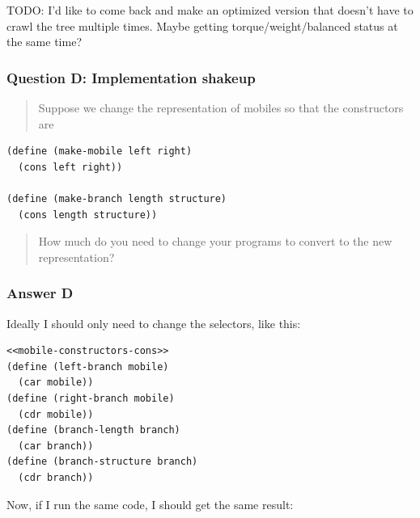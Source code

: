 \documentclass[final,fleqn,titlepage,twoside]{article}
\begin{document}
TODO: I'd like to come back and make an optimized version that doesn't have to
crawl the tree multiple times. Maybe getting torque/weight/balanced status at
the same time?

\subsubsection{Question D: Implementation shakeup}
\label{sec:org2982493}
\begin{quote}
Suppose we change the representation of mobiles so that the constructors are
\end{quote}

\begin{verbatim}
(define (make-mobile left right)
  (cons left right))

(define (make-branch length structure)
  (cons length structure))
\end{verbatim}

\begin{quote}
How much do you need to change your programs to convert to the new representation?
\end{quote}

\subsubsection{Answer D}
\label{sec:org57e6611}
Ideally I should only need to change the selectors, like this:

\begin{verbatim}
<<mobile-constructors-cons>>
(define (left-branch mobile)
  (car mobile))
(define (right-branch mobile)
  (cdr mobile))
(define (branch-length branch)
  (car branch))
(define (branch-structure branch)
  (cdr branch))
\end{verbatim}

Now, if I run the same code, I should get the same result:
\end{document}
